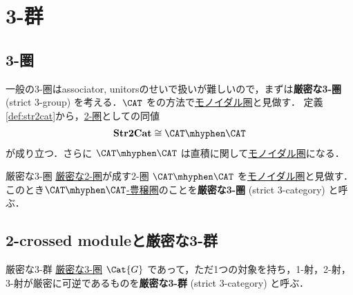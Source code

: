 \documentclass[TQFT_main]{subfiles}
\begin{document}
\section{3-群}

\subsection{3-圏}

一般の3-圏はassociator, unitorsのせいで扱いが難しいので，まずは\textbf{厳密な3-圏} (strict 3-group) を考える．$\CAT$ をの方法で\hyperref[redef:monoidal-category]{モノイダル圏}と見做す．
定義\ref{def:str2cat}から，\hyperref[def:2cat]{2-圏}としての同値
\begin{align}
    \bm{\mathrm{Str2Cat}} \cong \CAT\mhyphen\CAT
\end{align}
が成り立つ．さらに $\CAT\mhyphen\CAT$ は直積に関して\hyperref[redef:monoidal-category]{モノイダル圏}になる．

\begin{mydef}[label=def:str3cat]{厳密な3-圏}
    \hyperref[def:str2cat]{厳密な2-圏}が成す2-圏 $\CAT\mhyphen\CAT$ を\hyperref[redef:monoidal-category]{モノイダル圏}と見做す．
    このとき\hyperref[redef:enriched]{$\CAT\mhyphen\CAT$-豊穣圏}のことを\textbf{厳密な3-圏} (strict 3-category) と呼ぶ．
\end{mydef}

\subsection{2-crossed moduleと厳密な3-群}

\begin{mydef}[label=def:S3G]{厳密な3-群}
    \hyperref[def:str3-cat]{厳密な3-圏} $\Cat{G}$ であって，ただ1つの対象を持ち，1-射，2-射，3-射が厳密に可逆であるものを\textbf{厳密な3-群} (strict 3-category) と呼ぶ．
\end{mydef}
\end{document}
